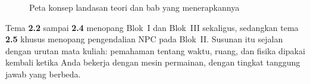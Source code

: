 \begin{figure}[htbp]
\centering

\caption{Peta konsep landasan teori dan bab yang menerapkannya}
\label{fig:peta-konsep}
\end{figure}

Tema \textbf{2.2} sampai \textbf{2.4} menopang Blok~I dan
Blok~III sekaligus, sedangkan tema \textbf{2.5} khusus menopang pengendalian
NPC pada Blok~II. Susunan itu sejalan dengan urutan mata kuliah: pemahaman
tentang waktu, ruang, dan fisika dipakai kembali ketika Anda bekerja dengan
mesin permainan, dengan tingkat tanggung jawab yang berbeda.
